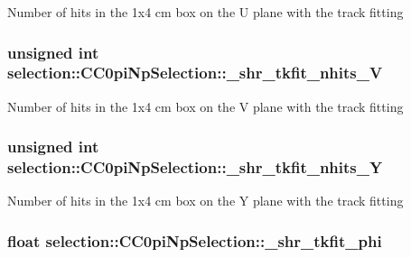 Number of hits in the 1x4 cm box on the U plane with the track fitting \hypertarget{classselection_1_1CC0piNpSelection_adab23c54dd799cdf83c31a10e4ae9061}{
\subsubsection[{\-\_\-shr\-\_\-tkfit\-\_\-nhits\-\_\-\-V}]{\setlength{\rightskip}{0pt plus 5cm}unsigned int selection\-::\-C\-C0pi\-Np\-Selection\-::\-\_\-shr\-\_\-tkfit\-\_\-nhits\-\_\-\-V\hspace{0.3cm}{\ttfamily [private]}}}\label{classselection_1_1CC0piNpSelection_adab23c54dd799cdf83c31a10e4ae9061}
Number of hits in the 1x4 cm box on the V plane with the track fitting \hypertarget{classselection_1_1CC0piNpSelection_ae3a53326b19594013c9df08b66ccaa73}{
\subsubsection[{\-\_\-shr\-\_\-tkfit\-\_\-nhits\-\_\-\-Y}]{\setlength{\rightskip}{0pt plus 5cm}unsigned int selection\-::\-C\-C0pi\-Np\-Selection\-::\-\_\-shr\-\_\-tkfit\-\_\-nhits\-\_\-\-Y\hspace{0.3cm}{\ttfamily [private]}}}\label{classselection_1_1CC0piNpSelection_ae3a53326b19594013c9df08b66ccaa73}
Number of hits in the 1x4 cm box on the Y plane with the track fitting \hypertarget{classselection_1_1CC0piNpSelection_aefb0bc61c417330a448ababb5363ad8f}{
\subsubsection[{\-\_\-shr\-\_\-tkfit\-\_\-phi}]{\setlength{\rightskip}{0pt plus 5cm}float selection\-::\-C\-C0pi\-Np\-Selection\-::\-\_\-shr\-\_\-tkfit\-\_\-phi\hspace{0.3cm}{\ttfamily [private]}}}\label{classselection_1_1CC0piNpSelection_aefb0bc61c417330a448ababb5363ad8f}
